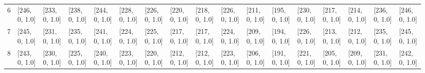 \begin{tabular}{lllllllllllllllll}
6    &    [246, 0, 1.0] &  [233, 0, 1.0] &  [238, 0, 1.0] &  [244, 0, 1.0] &  [228, 0, 1.0] &  [226, 0, 1.0] &  [220, 0, 1.0] &  [218, 0, 1.0] &  [226, 0, 1.0] &  [211, 0, 1.0] &  [195, 0, 1.0] &  [230, 0, 1.0] &   [217, 0, 1.0] &  [214, 0, 1.0] &  [236, 0, 1.0] &  [246, 0, 1.0] \\
7    &    [245, 0, 1.0] &  [231, 0, 1.0] &  [235, 0, 1.0] &  [241, 0, 1.0] &  [224, 0, 1.0] &  [225, 0, 1.0] &  [217, 0, 1.0] &  [217, 0, 1.0] &  [224, 0, 1.0] &  [209, 0, 1.0] &  [194, 0, 1.0] &  [226, 0, 1.0] &   [213, 0, 1.0] &  [212, 0, 1.0] &  [235, 0, 1.0] &  [245, 0, 1.0] \\
8    &    [243, 0, 1.0] &  [230, 0, 1.0] &  [225, 0, 1.0] &  [240, 0, 1.0] &  [223, 0, 1.0] &  [220, 0, 1.0] &  [212, 0, 1.0] &  [212, 0, 1.0] &  [223, 0, 1.0] &  [206, 0, 1.0] &  [191, 0, 1.0] &  [221, 0, 1.0] &   [205, 0, 1.0] &  [209, 0, 1.0] &  [231, 0, 1.0] &  [242, 0, 1.0] \\
\bottomrule
\end{tabular}
